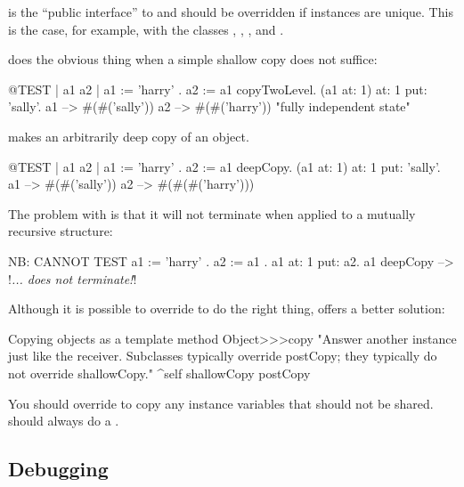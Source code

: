\documentclass[a4paper,10pt,twoside]{book}
\begin{document}
 is the ``public interface'' to  and should be overridden if instances are unique.
This is the case, for example, with the classes , , ,  and .

 does the obvious thing when a simple shallow copy does not suffice:

\begin{code}{@TEST | a1 a2 |}
a1 := { { 'harry' } } .
a2 := a1 copyTwoLevel.
(a1 at: 1) at: 1 put: 'sally'.
a1 --> #(#('sally'))
a2 --> #(#('harry'))    "fully independent state"
\end{code}

 makes an arbitrarily deep copy of an object.

\begin{code}{@TEST | a1 a2 |}
a1 := { { { 'harry' } } } .
a2 := a1 deepCopy.
(a1 at: 1) at: 1 put: 'sally'.
a1 --> #(#('sally'))
a2 --> #(#(#('harry')))
\end{code}

The problem with  is that it will not terminate when applied to a mutually recursive structure:

\begin{code}{NB: CANNOT TEST}
a1 := { 'harry' }.
a2 := { a1 }.
a1 at: 1 put: a2.
a1 deepCopy --> !\emph{... does not terminate!}!
\end{code}

Although it is possible to override  to do the right thing,  offers a better solution:

\begin{method}{Copying objects as a template method}
Object>>>copy
    "Answer another instance just like the receiver. Subclasses typically override postCopy; they typically do not override shallowCopy."
    ^self shallowCopy postCopy
\end{method}

You should override  to copy any instance variables that should not be shared.
 should always do a .


\subsection{Debugging}
\end{document}

